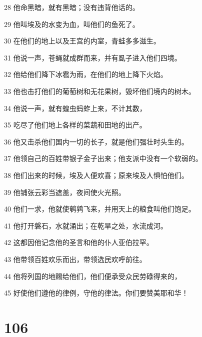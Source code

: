 \par 28 他命黑暗，就有黑暗；没有违背他话的。
\par 29 他叫埃及的水变为血，叫他们的鱼死了。
\par 30 在他们的地上以及王宫的内室，青蛙多多滋生。
\par 31 他说一声，苍蝇就成群而来，并有虱子进入他们四境。
\par 32 他给他们降下冰雹为雨，在他们的地上降下火焰。
\par 33 他也击打他们的葡萄树和无花果树，毁坏他们境内的树木。
\par 34 他说一声，就有蝗虫蚂蚱上来，不计其数，
\par 35 吃尽了他们地上各样的菜蔬和田地的出产。
\par 36 他又击杀他们国内一切的长子，就是他们强壮时头生的。
\par 37 他领自己的百姓带银子金子出来；他支派中没有一个软弱的。
\par 38 他们出来的时候，埃及人便欢喜；原来埃及人惧怕他们。
\par 39 他铺张云彩当遮盖，夜间使火光照。
\par 40 他们一求，他就使鹌鹑飞来，并用天上的粮食叫他们饱足。
\par 41 他打开磐石，水就涌出；在乾旱之处，水流成河。
\par 42 这都因他记念他的圣言和他的仆人亚伯拉罕。
\par 43 他带领百姓欢乐而出，带领选民欢呼前往。
\par 44 他将列国的地赐给他们，他们便承受众民劳碌得来的，
\par 45 好使他们遵他的律例，守他的律法。你们要赞美耶和华！

\chapter{106}

